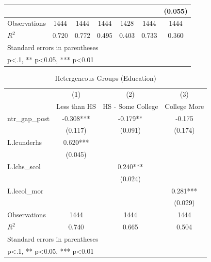 \documentclass[12pt, final]{CSP}
\begin{document}
\begin{table}[htbp]
\begin{tabular}{l*{6}{c}}
                    &            &            &            &            &            &  (0.055)   \\
\midrule
Observations        &     1444   &     1444   &     1444   &     1428   &     1444   &     1444   \\
\(R^{2}\)           &    0.720   &    0.772   &    0.495   &    0.403   &    0.733   &    0.360   \\
\hline
\bottomrule
\multicolumn{7}{l}{\footnotesize Standard errors in parentheses}\\
\multicolumn{7}{l}{\footnotesize * p<.1, ** p<0.05, *** p<0.01}\\
\end{tabular}
\end{table}

\begin{table}[htbp]\centering
\def\sym#1{\ifmmode^{#1}\else\(^{#1}\)\fi}
\caption{Hetergeneous Groups (Education)}
\begin{tabular}{l*{3}{c}}
\toprule
\hline
\hline
&\multicolumn{1}{c}{(1)}   &\multicolumn{1}{c}{(2)}   &\multicolumn{1}{c}{(3)}   \\
&\multicolumn{1}{c}{Less than HS}   &\multicolumn{1}{c}{HS - Some College}   &\multicolumn{1}{c}{College More}   \\
\hline
\midrule
ntr\_gap\_post        &   -0.308***&   -0.179** &   -0.175   \\
                    &  (0.117)   &  (0.091)   &  (0.174)   \\
\addlinespace
L.lcunderhs         &    0.620***&            &            \\
                    &  (0.045)   &            &            \\
\addlinespace
L.lchs\_scol         &            &    0.240***&            \\
                    &            &  (0.024)   &            \\
\addlinespace
L.lccol\_mor         &            &            &    0.281***\\
                    &            &            &  (0.029)   \\
\midrule
Observations        &     1444   &     1444   &     1444   \\
\(R^{2}\)           &    0.740   &    0.665   &    0.504   \\
\hline
\bottomrule
\multicolumn{4}{l}{\footnotesize Standard errors in parentheses}\\
\multicolumn{4}{l}{\footnotesize * p<.1, ** p<0.05, *** p<0.01}\\
\end{tabular}
\end{table}
\end{document}
